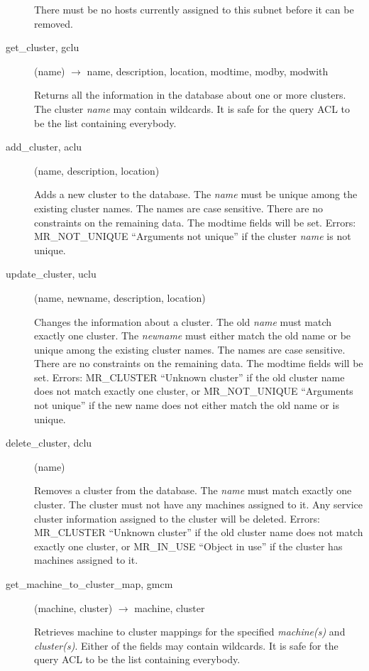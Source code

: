 \documentclass{article}
\begin{document}
\begin{description}
There must be no hosts currently assigned to this subnet
before it can be removed.


\item[get\_cluster, gclu](name) $\rightarrow$ name, description, location,
modtime, modby, modwith

Returns all the information in the database about one or more
clusters.  The cluster {\em name} may contain wildcards.  It is safe for
the query ACL to be the list containing everybody.

\item[add\_cluster, aclu](name, description, location)

Adds a new cluster to the database.  The {\em name} must be unique among
the existing cluster names.  The names are case sensitive.  There are
no constraints on the remaining data.  The modtime fields will be set.
Errors: MR\_NOT\_UNIQUE ``Arguments not unique'' if the cluster {\em name}
is not unique.

\item[update\_cluster, uclu](name, newname, description, location)

Changes the information about a cluster.  The old {\em name} must match
exactly one cluster.  The {\em newname} must either match the old name
or be unique among the existing cluster names.  The names are case
sensitive.  There are no constraints on the remaining data.  The
modtime fields will be set.  Errors: MR\_CLUSTER ``Unknown cluster'' if
the old cluster name does not match exactly one cluster, or
MR\_NOT\_UNIQUE ``Arguments not unique'' if the new name does not either
match the old name or is unique.

\item[delete\_cluster, dclu](name)

Removes a cluster from the database.  The {\em name} must match exactly
one cluster.  The cluster must not have any machines assigned to it.
Any service cluster information assigned to the cluster will be
deleted.  Errors: MR\_CLUSTER ``Unknown cluster'' if the old cluster
name does not match exactly one cluster, or MR\_IN\_USE ``Object in use''
if the cluster has machines assigned to it.

\item[get\_machine\_to\_cluster\_map, gmcm](machine, cluster)
$\rightarrow$ machine, cluster

Retrieves machine to cluster mappings for the specified {\em
machine(s)\/} and {\em cluster(s)}. Either of the fields may contain
wildcards. It is safe for the query ACL to be the list containing
everybody.


\end{description}
\end{document}
